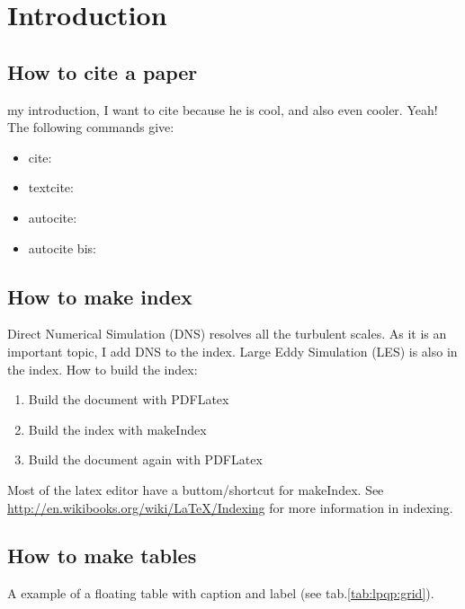 \chapter{Introduction}
\label{sec: Introduction}

\section{How to cite a paper}
\label{sec: How to cite a paper}

my introduction, I want to cite \textcite{Moeng2007} because he is cool, and also \textcite{Pope2000} even cooler. Yeah! The following commands  give:
\begin{itemize}
\item cite: \cite{Moeng2007}
\item textcite: \textcite{Moeng2007}	
\item autocite: \autocite{Moeng2007,Pope2000}
\item autocite bis: \autocite[e.g.][]{Moeng2007,Pope2000}	
\end{itemize}

\section{How to make index}
\label{sec:How to make index}
Direct Numerical Simulation  (DNS) resolves all the turbulent scales. As it is an important topic, I add DNS to the index. Large Eddy Simulation  (LES) is also in the index. How to build the index:
\begin{enumerate}
	\item Build the document with PDFLatex
	\item Build the index with makeIndex
	\item Build the document again with PDFLatex
\end{enumerate}
Most of the latex editor have a buttom/shortcut for makeIndex. See \url{http://en.wikibooks.org/wiki/LaTeX/Indexing} for more information in indexing.

\section{How to make tables}
\label{sec:How to make tables}
A example of a floating table with caption and label (see tab.\ref{tab:lpqp:grid}).


